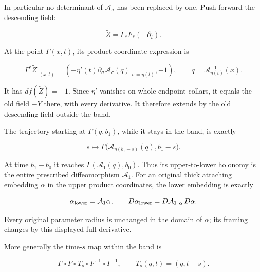 In particular no determinant of \(\mathcal A_\sigma\) has been replaced by one. Push forward the descending field:

\begin{equation}
\widetilde Z=\Gamma_*F_*(-\partial_t).
 \label{courseIII:morse-trajectories-and-critical-value-lowering:eq:1.5}
\end{equation}

At the point \(\Gamma(x,t)\), its product-coordinate expression is

\begin{equation}
\Gamma^*\widetilde Z\big|_{(x,t)}
 =
 \left(
 -\eta'(t)\partial_\sigma\mathcal A_\sigma(q)|_{\sigma=\eta(t)},-1
 \right),
 \qquad q=\mathcal A_{\eta(t)}^{-1}(x).
 \label{courseIII:morse-trajectories-and-critical-value-lowering:eq:1.6}
\end{equation}

It has \(df(\widetilde Z)=-1\). Since \(\eta'\) vanishes on whole endpoint collars, it equals the old field \(-Y\) there, with every derivative. It therefore extends by the old descending field outside the band.

The trajectory starting at \(\Gamma(q,b_1)\), while it stays in the band, is exactly

\begin{equation}
s\longmapsto
 \Gamma\bigl(\mathcal A_{\eta(b_1-s)}(q),b_1-s\bigr).
 \label{courseIII:morse-trajectories-and-critical-value-lowering:eq:1.7}
\end{equation}

At time \(b_1-b_0\) it reaches \(\Gamma(\mathcal A_1(q),b_0)\). Thus its upper-to-lower holonomy is the entire prescribed diffeomorphism \(\mathcal A_1\). For an original thick attaching embedding \(\alpha\) in the upper product coordinates, the lower embedding is exactly

\begin{equation}
\alpha_{\rm lower}=\mathcal A_1\alpha,\qquad
 D\alpha_{\rm lower}=D\mathcal A_1|_\alpha\,D\alpha.
 \label{courseIII:morse-trajectories-and-critical-value-lowering:eq:1.8}
\end{equation}

Every original parameter radius is unchanged in the domain of \(\alpha\); its framing changes by this displayed full derivative.

More generally the time-\(s\) map within the band is

\begin{equation}
\Gamma\circ F\circ T_s\circ F^{-1}\circ\Gamma^{-1},
 \qquad T_s(q,t)=(q,t-s).
 \label{courseIII:morse-trajectories-and-critical-value-lowering:eq:1.9}
\end{equation}

